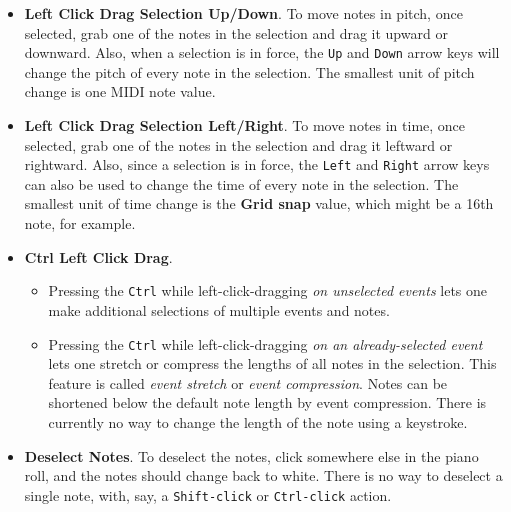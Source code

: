 \begin{itemize}
      \item
         \textbf{Left Click Drag Selection Up/Down}.
         To move notes in pitch, once selected, grab one of the notes in the
         selection and drag it upward or downward.
         Also, when a selection is in force, the
         \texttt{Up} and \texttt{Down} arrow keys will
         change the pitch of every note in the selection.
         The smallest unit of pitch change is one MIDI note value.
      \item
         \textbf{Left Click Drag Selection Left/Right}.
         To move notes in time, once selected, grab one of the notes in the
         selection and drag it leftward or rightward.
         Also, since a selection is in force, the
         \texttt{Left} and \texttt{Right} arrow keys can also
         be used to change the time of every note in the selection.
         The smallest unit of time change is the \textbf{Grid snap} value,
         which might be a 16th note, for example.
      \item
         \textbf{Ctrl Left Click Drag}.
         \begin{itemize}
            \item Pressing the \texttt{Ctrl} while left-click-dragging
               \textsl{on unselected events} lets one make additional
               selections of multiple events and notes.
            \item Pressing the \texttt{Ctrl} while left-click-dragging
               \textsl{on an already-selected event} lets one stretch or
               compress the lengths of all notes in the selection.
               This feature is called \textsl{event stretch}
               or \textsl{event compression}.
               Notes can be shortened below the default note length by event
               compression.  There is currently no way to change the length of
               the note using a keystroke.
         \end{itemize}
      \item {} 
         \textbf{Deselect Notes}.
         To deselect the notes, click somewhere else in the piano roll, and the
         notes should change back to white.  There is no way to deselect a
         single note, with, say, a \texttt{Shift-click} or
         \texttt{Ctrl-click} action.
   \end{itemize}

